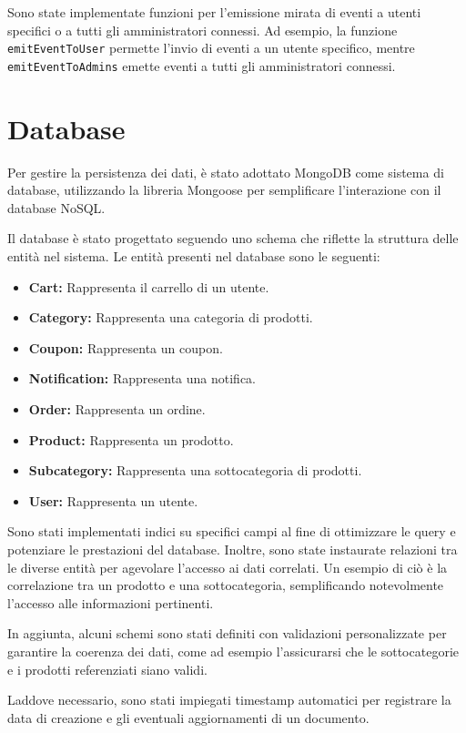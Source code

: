 Sono state implementate funzioni per l'emissione mirata di eventi a utenti specifici o a tutti gli amministratori connessi. Ad esempio, la funzione \texttt{emitEventToUser} permette l'invio di eventi a un utente specifico, mentre \texttt{emitEventToAdmins} emette eventi a tutti gli amministratori connessi.


\section{Database}
Per gestire la persistenza dei dati, è stato adottato MongoDB come sistema di database, utilizzando la libreria Mongoose per semplificare l'interazione con il database NoSQL.

Il database è stato progettato seguendo uno schema che riflette la struttura delle entità nel sistema.
Le entità presenti nel database sono le seguenti:
\begin{itemize}
    \item \textbf{Cart:} Rappresenta il carrello di un utente.
    \item \textbf{Category:} Rappresenta una categoria di prodotti.
    \item \textbf{Coupon:} Rappresenta un coupon.
    \item \textbf{Notification:} Rappresenta una notifica.
    \item \textbf{Order:} Rappresenta un ordine.
    \item \textbf{Product:} Rappresenta un prodotto.
    \item \textbf{Subcategory:} Rappresenta una sottocategoria di prodotti.
    \item \textbf{User:} Rappresenta un utente.
\end{itemize}

Sono stati implementati indici su specifici campi al fine di ottimizzare le query e potenziare le prestazioni del database. Inoltre, sono state instaurate relazioni tra le diverse entità per agevolare l'accesso ai dati correlati. Un esempio di ciò è la correlazione tra un prodotto e una sottocategoria, semplificando notevolmente l'accesso alle informazioni pertinenti.

In aggiunta, alcuni schemi sono stati definiti con validazioni personalizzate per garantire la coerenza dei dati, come ad esempio l'assicurarsi che le sottocategorie e i prodotti referenziati siano validi.

Laddove necessario, sono stati impiegati timestamp automatici per registrare la data di creazione e gli eventuali aggiornamenti di un documento.
